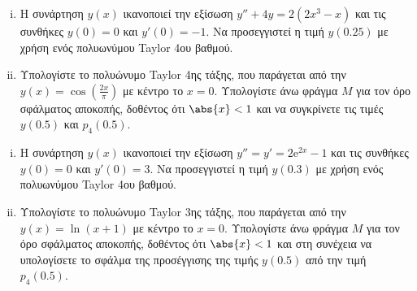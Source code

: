 \documentclass[a4paper]{report}
\begin{document}
\begin{center}
  \minibox{\large\bfseries \textcolor{Col1}{Ασκήσεις στον τύπο Taylor}}
\end{center}

\vspace{\baselineskip}






\begin{exercise}
\item 
  \begin{enumerate}[i)]
    \item Η συνάρτηση $ y(x) $ ικανοποιεί την εξίσωση $ y'' + 4y = 2(2x^3 - x) $ και τις 
      συνθήκες $ y(0) = 0 $ και $ y'(0)=-1 $. Να προσεγγιστεί η τιμή $ y(0.25) $ με 
      χρήση ενός πολυωνύμου Taylor 4ου βαθμού.
    \item Υπολογίστε το πολυώνυμο Taylor 4ης τάξης, που παράγεται από την 
      $ y(x) = \cos{( \frac{2x}{\pi} )} $ με κέντρο το $ x=0 $. Υπολογίστε άνω φράγμα 
      $M$ για τον όρο σφάλματος αποκοπής, δοθέντος ότι $ \abs{x} < 1 $ και να 
      συγκρίνετε τις τιμές $ y(0.5) $ και $ p_{4}(0.5) $.
  \end{enumerate}
\end{exercise}

\begin{exercise}
\item 
  \begin{enumerate}[i)]
    \item Η συνάρτηση $ y(x) $ ικανοποιεί την εξίσωση $ y''=y'= 2 \mathrm{e}^{2x} -1$ 
      και τις συνθήκες $ y(0) = 0 $ και $ y'(0)=3 $. Να προσεγγιστεί η τιμή $ y(0.3) $ 
      με χρήση ενός πολυωνύμου Taylor 4ου βαθμού.
    \item Υπολογίστε το πολυώνυμο Taylor 3ης τάξης, που παράγεται από την 
      $ y(x) = \ln{(x+1)} $ με κέντρο το $ x=0 $. Υπολογίστε άνω φράγμα 
      $M$ για τον όρο σφάλματος αποκοπής, δοθέντος ότι $ \abs{x} < 1 $ και στη συνέχεια 
      να υπολογίσετε το σφάλμα της προσέγγισης της τιμής $ y(0.5) $ από την
      τιμή $ p_{4}(0.5) $.
  \end{enumerate}
\end{exercise}

\vspace{\baselineskip}

\begin{center}
  \minibox{\large\bfseries \textcolor{Col1}{Ασκήσεις στις παραγώγους}}
\end{center}
\end{document}
